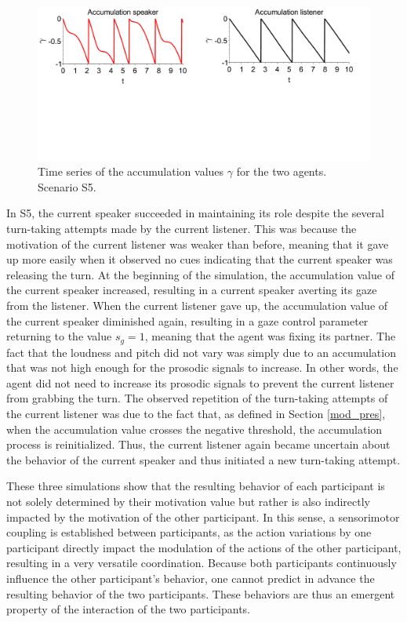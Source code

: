 \documentclass[twocolumn]{svjour3}
\begin{document}
\begin{figure}
  \centering
  \includegraphics[width=\linewidth]{figure/acc_sc2_small.pdf}
  \caption{Time series of the accumulation values $\gamma$ for the two agents. Scenario S5.}
  \label{acc_buttin}
\end{figure}

In S5, the current speaker succeeded in maintaining its role despite the several turn-taking attempts made by the current listener. This was because the motivation of the current listener was weaker than before, meaning that it gave up more easily when it observed no cues indicating that the current speaker was releasing the turn. At the beginning of the simulation, the accumulation value of the current speaker increased, resulting in a current speaker averting its gaze from the listener. When the current listener gave up, the accumulation value of the current speaker diminished again, resulting in a gaze control parameter returning to the value $s_g=1$, meaning that the agent was fixing its partner. The fact that the loudness and pitch did not vary was simply due to an accumulation that was not high enough for the prosodic signals to increase. In other words, the agent did not need to increase its prosodic signals to prevent the current listener from grabbing the turn. The observed repetition of the turn-taking attempts of the current listener was due to the fact that, as defined in Section \ref{mod_pres}, when the accumulation value crosses the negative threshold, the accumulation process is reinitialized. Thus, the current listener again became  uncertain about the behavior of the current speaker and thus initiated a new turn-taking attempt. 


These three simulations show that the resulting behavior of each participant is not solely determined by their motivation value but rather is also indirectly impacted by the motivation of the other participant. In this sense, a sensorimotor coupling is established between participants, as the action variations by one participant directly impact the modulation of the actions of the other participant, resulting in a very versatile coordination. Because both participants continuously influence the other participant's behavior, one cannot predict in advance the resulting behavior of the two participants. These behaviors are thus an emergent property of the interaction of the two participants. 
\end{document}
